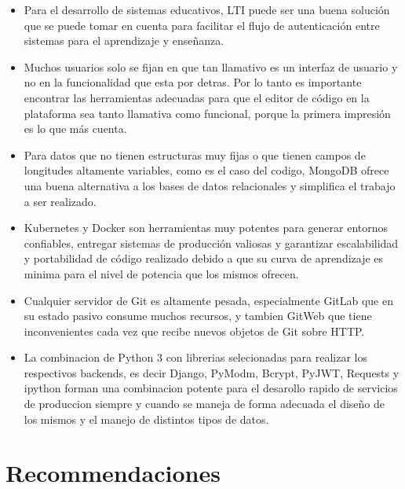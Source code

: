 \begin{itemize}
  \item Para el desarrollo de sistemas educativos, LTI puede ser una buena solución que se puede tomar en cuenta para facilitar el flujo de autenticación entre sistemas para el aprendizaje y enseñanza.
  \item Muchos usuarios solo se fijan en que tan llamativo es un interfaz de usuario y no en la funcionalidad que esta por detras. Por lo tanto es importante encontrar las herramientas adecuadas para que el editor de código en la plataforma sea tanto llamativa como funcional, porque la primera impresión es lo que más cuenta.
  \item Para datos que no tienen estructuras muy fijas o que tienen campos de longitudes altamente variables, como es el caso del codigo, MongoDB ofrece una buena alternativa a los bases de datos relacionales y simplifica el trabajo a ser realizado.
  \item Kubernetes y Docker son herramientas muy potentes para generar entornos confiables, entregar sistemas de producción valiosas y garantizar escalabilidad y portabilidad de código realizado debido a que su curva de aprendizaje es minima para el nivel de potencia que los mismos ofrecen.
  \item Cualquier servidor de Git es altamente pesada, especialmente GitLab que en su estado pasivo consume muchos recursos, y tambien GitWeb que tiene inconvenientes cada vez que recibe nuevos objetos de Git sobre HTTP.
  \item La combinacion de Python 3 con librerias selecionadas para realizar los respectivos backends, es decir Django, PyModm, Bcrypt, PyJWT, Requests y ipython forman una combinacion potente para el desarollo rapido de servicios de produccion siempre y cuando se maneja de forma adecuada el diseño de los mismos y el manejo de distintos tipos de datos.
\end{itemize}


\section{Recommendaciones}

